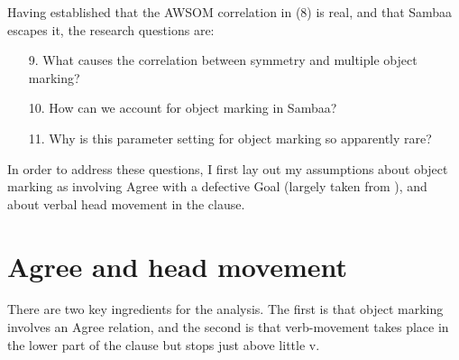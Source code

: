 \documentclass[output=paper
,modfonts
,nonflat]{langsci/langscibook}
\begin{document}

Having established that the AWSOM correlation in (8) is real, and that Sambaa escapes it, the research questions are:
\begin{enumerate}
\item [9.]What causes the correlation between symmetry and multiple object marking?
\item [10.]How can we account for object marking in Sambaa?
\item [11.]Why is this parameter setting for object marking so apparently rare?
\end{enumerate}
In order to address these questions, I first lay out my assumptions about object marking as involving Agree with a defective Goal (largely taken from \citealt{Van_der_Wal2015}), and about verbal head movement in the clause.

\section{Agree and head movement}

There are two key ingredients for the analysis. The first is that object marking involves an Agree relation, and the second is that verb-movement takes place in the lower part of the clause but stops just above little v.
\end{document}
